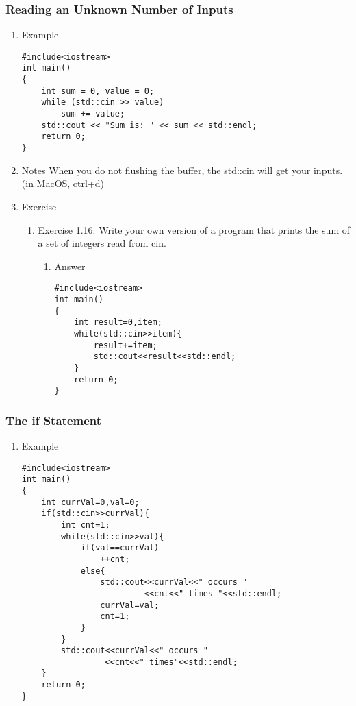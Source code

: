 \documentclass[11pt]{article}
\begin{document}
\subsubsection{Reading an Unknown Number of Inputs}
\label{sec-1-4-3}
\begin{enumerate}
\item Example
\label{sec-1-4-3-1}
\begin{verbatim}
#include<iostream>
int main()
{
    int sum = 0, value = 0;
    while (std::cin >> value)
        sum += value;
    std::cout << "Sum is: " << sum << std::endl;
    return 0;
}
\end{verbatim}
\item Notes
\label{sec-1-4-3-2}
When you do not flushing the buffer, the std::cin will get your inputs.
(in MacOS, ctrl+d)
\item Exercise
\label{sec-1-4-3-3}
\begin{enumerate}
\item Exercise 1.16: Write your own version of a program that prints the sum of a set of integers read from cin.
\label{sec-1-4-3-3-1}
\begin{enumerate}
\item Answer
\label{sec-1-4-3-3-1-1}
\begin{verbatim}
#include<iostream>
int main()
{
    int result=0,item;
    while(std::cin>>item){
        result+=item;
        std::cout<<result<<std::endl;
    }
    return 0;
}
\end{verbatim}
\end{enumerate}
\end{enumerate}
\end{enumerate}
\subsubsection{The if Statement}
\label{sec-1-4-4}
\begin{enumerate}
\item Example
\label{sec-1-4-4-1}
\begin{verbatim}
#include<iostream>
int main()
{
    int currVal=0,val=0;
    if(std::cin>>currVal){
        int cnt=1;
        while(std::cin>>val){
            if(val==currVal)
                ++cnt;
            else{
                std::cout<<currVal<<" occurs "
                         <<cnt<<" times "<<std::endl;
                currVal=val;
                cnt=1;
            }
        }
        std::cout<<currVal<<" occurs "
                 <<cnt<<" times"<<std::endl;
    }
    return 0;
}
\end{verbatim}
\end{enumerate}
\end{document}
